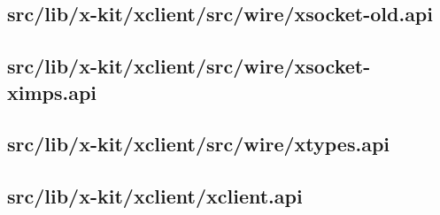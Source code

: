 \subsection{src/lib/x-kit/xclient/src/wire/xsocket-old.api}


\subsection{src/lib/x-kit/xclient/src/wire/xsocket-ximps.api}


\subsection{src/lib/x-kit/xclient/src/wire/xtypes.api}


\subsection{src/lib/x-kit/xclient/xclient.api}



